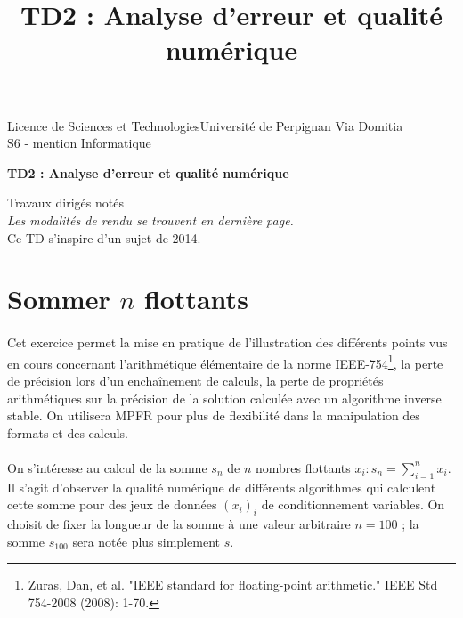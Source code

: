 \documentclass{exam}
\title{TD2 : Analyse d'erreur et qualité numérique}
\begin{document}
    \hspace{-0.7cm}
    \hrulefill
    \begin{flushleft}
        {Licence de Sciences et Technologies\hfill Université de Perpignan Via Domitia\\
        S6 - mention Informatique}
    \end{flushleft}
    \begin{center}
        {\Large\bfseries TD2 : Analyse d'erreur et qualité numérique\par}
        \vspace{0.5cm}
        {\large Travaux dirigés notés}\\
        \vspace{0.1cm}
        \textit{Les modalités de rendu se trouvent en dernière page.}\\
        \vspace{0.2cm}
        \footnotesize Ce TD s'inspire d'un sujet de 2014.
    \end{center}
    \hrulefill

    \setcounter{enumi}{1}
    \section{Sommer $n$ flottants}
    \paragraph{}Cet exercice permet la mise en pratique de l'illustration des différents points vus en cours concernant l'arithmétique élémentaire de la norme IEEE-754\footnote{Zuras, Dan, et al. "IEEE standard for floating-point arithmetic." IEEE Std 754-2008 (2008): 1-70.}, la perte de précision lors d'un enchaînement de calculs, la perte de propriétés arithmétiques sur la précision de la solution calculée avec un algorithme inverse stable. On utilisera MPFR pour plus de flexibilité dans la manipulation des formats et des calculs.
    \paragraph{}On s'intéresse au calcul de la somme $s_{n}$ de $n$ nombres flottants $x_{i} : s_{n} = \sum\limits_{i=1}^{n}x_{i}$. Il s'agit d'observer la qualité numérique de différents algorithmes qui calculent cette somme pour des jeux de données $(x_{i})_{i}$ de conditionnement variables. On choisit de fixer la longueur de la somme à une valeur arbitraire $n=100$ ; la somme $s_{100}$ sera notée plus simplement $s$.
\end{document}
